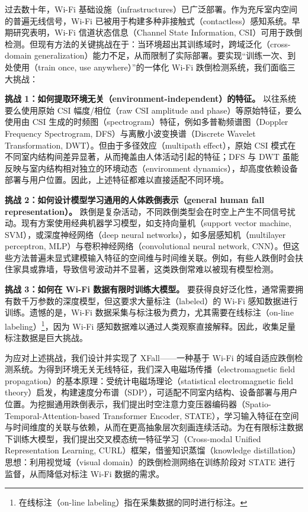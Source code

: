 \documentclass[UTF8,twocolumn]{ctexart}
\begin{document}
过去数十年，Wi\!-\!Fi 基础设施（infrastructures）已广泛部署。作为充斥室内空间的普遍无线信号，Wi\!-\!Fi 已被用于构建多种非接触式（contactless）感知系统\cite{ref9,ref10,ref11,ref12,ref13}。早期研究\cite{ref14,ref15,ref16}表明，Wi\!-\!Fi 信道状态信息（Channel State Information, CSI）可用于跌倒检测。但现有方法的关键挑战在于：当环境超出其训练域时，跨域泛化（cross-domain generalization）能力不足，从而限制了实际部署。要实现“训练一次、到处使用（train once, use anywhere）”的一体化 Wi\!-\!Fi 跌倒检测系统，我们面临三大挑战：

\textbf{挑战 1：如何提取环境无关（environment-independent）的特征。}
以往系统要么使用原始 CSI 幅度/相位（raw CSI amplitude and phase）\cite{ref14,ref17}等原始特征，要么使用由 CSI 生成的时频图（spectrogram）特征，例如多普勒频谱图（Doppler Frequency Spectrogram, DFS）\cite{ref15}与离散小波变换谱（Discrete Wavelet Transformation, DWT）\cite{ref18}。但由于多径效应（multipath effect），原始 CSI 模式在不同室内结构间差异显著，从而掩盖由人体活动引起的特征；DFS 与 DWT 虽能反映与室内结构相对独立的环境动态（environment dynamics），却高度依赖设备部署与用户位置\cite{ref19}。因此，上述特征都难以直接适配不同环境。

\textbf{挑战 2：如何设计模型学习通用的人体跌倒表示（general human fall representation）。}
跌倒是复杂活动，不同跌倒类型会在时空上产生不同信号扰动。现有方案使用经典机器学习模型，如支持向量机（support vector machine, SVM）\cite{ref15}，或深度神经网络（deep neural networks），如多层感知机（multilayer perceptron, MLP）与卷积神经网络（convolutional neural network, CNN）\cite{ref7}。但这些方法普遍未显式建模输入特征的空间维与时间维关联。例如，有些人跌倒时会扶住家具或靠墙，导致信号波动并不显著，这类跌倒常难以被现有模型检测。

\textbf{挑战 3：如何在 Wi\!-\!Fi 数据有限时训练大模型。}
要获得良好泛化性，通常需要拥有数千万参数的深度模型，但这要求大量标注（labeled）的 Wi\!-\!Fi 感知数据进行训练。遗憾的是，Wi\!-\!Fi 数据采集与标注极为费力，尤其需要在线标注（on-line labeling）\footnote{在线标注（on-line labeling）指在采集数据的同时进行标注。}，因为 Wi\!-\!Fi 感知数据难以通过人类观察直接解释\cite{ref20}。因此，收集足量标注数据是巨大挑战。

为应对上述挑战，我们设计并实现了 XFall——一种基于 Wi\!-\!Fi 的域自适应跌倒检测系统。为得到环境无关无线特征，我们深入电磁场传播（electromagnetic field propagation）的基本原理：受统计电磁场理论（statistical electromagnetic field theory）启发，构建速度分布谱（SDP），可适配不同室内结构、设备部署与用户位置。为挖掘通用跌倒表示，我们提出时空注意力变压器编码器（Spatio-Temporal-Attention-based Transformer Encoder, STATE），学习输入特征在空间与时间维度的关联与依赖，从而在更高抽象层次刻画连续活动。为在有限标注数据下训练大模型，我们提出交叉模态统一特征学习（Cross-modal Unified Representation Learning, CURL）框架，借鉴知识蒸馏（knowledge distillation）思想\cite{ref21}：利用视觉域（visual domain）的跌倒检测网络在训练阶段对 STATE 进行监督，从而降低对标注 Wi\!-\!Fi 数据的需求。
\end{document}
